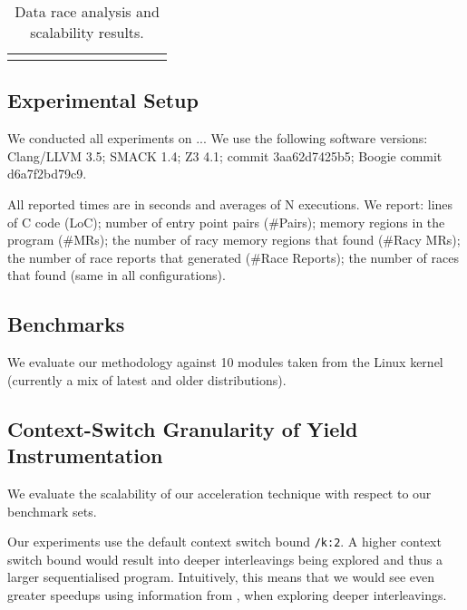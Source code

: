 \newcommand{\colspacing}{\hspace{1.8em}}
\begin{table*}[t]
\small
\centering
\begin{tabular}{l rrr rrr rr r r}
\centering

\end{tabular}
\caption{Data race analysis and scalability results.}
\label{tab:races}
\end{table*}

\subsection{Experimental Setup}
\label{eval:setup}

We conducted all experiments on ... We use the following software versions: Clang/LLVM 3.5; SMACK 1.4; Z3 4.1; \corral commit 3aa62d7425b5; Boogie commit d6a7f2bd79c9.

All reported times are in seconds and averages of N executions. We report: lines of C code (LoC); number of entry point pairs (\#Pairs); memory regions in the program (\#MRs); the number of racy memory regions that \whoop found (\#Racy MRs); the number of race reports that \whoop generated (\#Race Reports); the number of races that \corral found (same in all configurations).

\subsection{Benchmarks}
\label{eval:benchmarks}

We evaluate our methodology against 10 modules taken from the Linux kernel (currently a mix of latest and older distributions). 

\subsection{Context-Switch Granularity of Yield Instrumentation}
\label{eval:granularity}

We evaluate the scalability of our acceleration technique with respect to our benchmark sets.

Our experiments use the default \corral context switch bound \texttt{/k:2}. A higher context switch bound would result into deeper interleavings being explored and thus a larger sequentialised program. Intuitively, this means that we would see even greater speedups using information from \whoop, when exploring deeper interleavings. 

